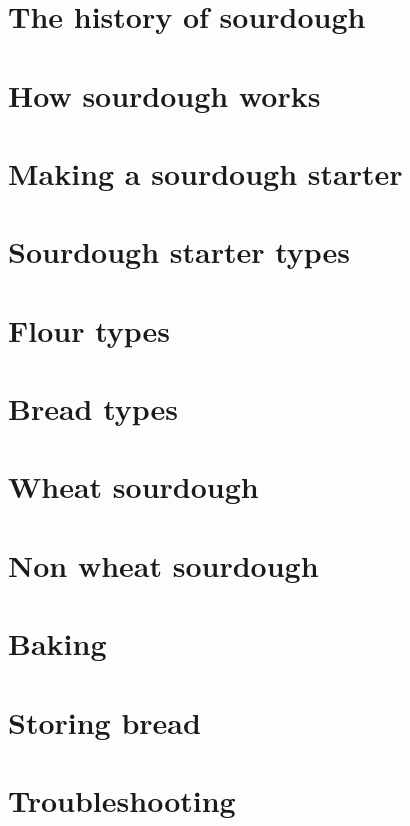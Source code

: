\documentclass[a4paper, 12pt]{book}
\begin{document}
\mainmatter

\chapter{The history of sourdough}


\chapter{How sourdough works}


\chapter{Making a sourdough starter}


\chapter{Sourdough starter types}


\chapter{Flour types}


\chapter{Bread types}


\chapter{Wheat sourdough}
\label{chapter:wheat-sourdough}


\chapter{Non wheat sourdough}
\label{chapter:non-wheat-sourdough}


\chapter{Baking}
\label{chapter:baking}


\chapter{Storing bread}
\label{chapter:storing-bread}


\chapter{Troubleshooting}



\printbibliography
\end{document}
